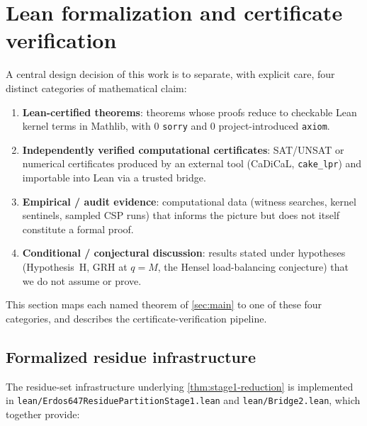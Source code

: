 
\section{Lean formalization and certificate verification}
\label{sec:lean}

A central design decision of this work is to separate, with explicit
care, four distinct categories of mathematical claim:

\begin{enumerate}[leftmargin=*, label=(\textbf{C\arabic*})]
\item \textbf{Lean-certified theorems}: theorems whose proofs reduce
  to checkable Lean kernel terms in Mathlib, with $0$ \texttt{sorry}
  and $0$ project-introduced \texttt{axiom}.
\item \textbf{Independently verified computational certificates}:
  SAT/UNSAT or numerical certificates produced by an external tool
  (CaDiCaL, \texttt{cake\_lpr}) and importable into Lean via a
  trusted bridge.
\item \textbf{Empirical / audit evidence}: computational data
  (witness searches, kernel sentinels, sampled CSP runs) that informs
  the picture but does not itself constitute a formal proof.
\item \textbf{Conditional / conjectural discussion}: results stated
  under hypotheses (Hypothesis~H, GRH at $q = M$, the Hensel
  load-balancing conjecture) that we do not assume or prove.
\end{enumerate}

This section maps each named theorem of \cref{sec:main} to one of
these four categories, and describes the certificate-verification
pipeline.

\subsection{Formalized residue infrastructure}
\label{sec:lean-residue}

The residue-set infrastructure underlying
\cref{thm:stage1-reduction} is implemented in
\texttt{lean/Erdos647ResiduePartitionStage1.lean} and
\texttt{lean/Bridge2.lean}, which together provide:

